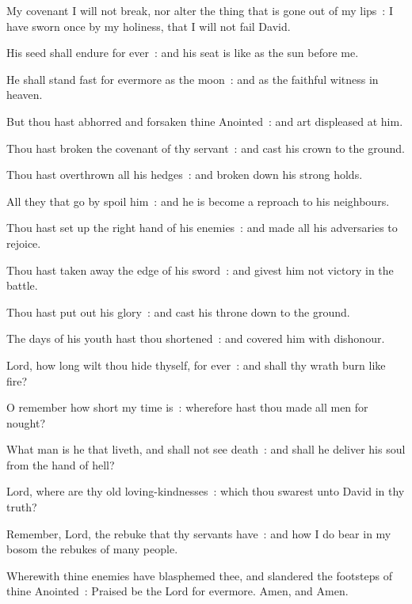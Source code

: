 My covenant I will not break, nor alter the thing that is gone out of my lips~: I have sworn once by my holiness, that I will not fail David.\par
{}His seed shall endure for ever~: and his seat is like as the sun before me.\par
{}He shall stand fast for evermore as the moon~: and as the faithful witness in heaven.\par
{}But thou hast abhorred and forsaken thine Anointed~: and art displeased at him.\par
{}Thou hast broken the covenant of thy servant~: and cast his crown to the ground.\par
{}Thou hast overthrown all his hedges~: and broken down his strong holds.\par
{}All they that go by spoil him~: and he is become a reproach to his neighbours.\par
{}Thou hast set up the right hand of his enemies~: and made all his adversaries to rejoice.\par
{}Thou hast taken away the edge of his sword~: and givest him not victory in the battle.\par
{}Thou hast put out his glory~: and cast his throne down to the ground.\par
{}The days of his youth hast thou shortened~: and covered him with dishonour.\par
{}Lord, how long wilt thou hide thyself, for ever~: and shall thy wrath burn like fire?\par
{}O remember how short my time is~: wherefore hast thou made all men for nought?\par
{}What man is he that liveth, and shall not see death~: and shall he deliver his soul from the hand of hell?\par
{}Lord, where are thy old loving-kindnesses~: which thou swarest unto David in thy truth?\par
{}Remember, Lord, the rebuke that thy servants have~: and how I do bear in my bosom the rebukes of many people.\par
{}Wherewith thine enemies have blasphemed thee, and slandered the footsteps of thine Anointed~: Praised be the Lord for evermore. Amen, and Amen.\par



\clearpage
